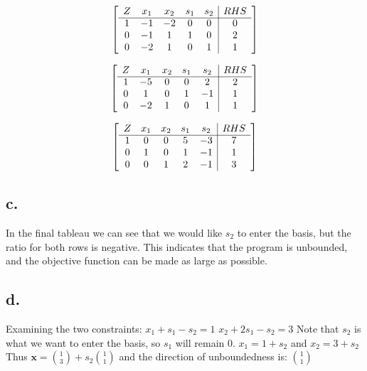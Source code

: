 \documentclass[10pt, letterpaper]{paper}
\begin{document}
\[
	\left[ {\begin{array}{ccccc|c}
	Z & x_1 & x_2 & s_1 & s_2 & RHS\\ \cline{1-6}
	1 & -1 & -2 & 0 & 0 & 0 \\
	0 & -1 & 1 & 1 & 0 & 2 \\
	0 & -2 & 1 & 0 & 1 & 1 \\
	\end{array} } \right]
\]

\[
	\left[ {\begin{array}{ccccc|c}
	Z & x_1 & x_2 & s_1 & s_2 & RHS\\ \cline{1-6}
	1 & -5 & 0 & 0 & 2 & 2 \\
	0 & 1 & 0 & 1 & -1 & 1 \\
	0 & -2 & 1 & 0 & 1 & 1 \\
	\end{array} } \right]
\]

\[
	\left[ {\begin{array}{ccccc|c}
	Z & x_1 & x_2 & s_1 & s_2 & RHS\\ \cline{1-6}
	1 & 0 & 0 & 5 & -3 & 7 \\
	0 & 1 & 0 & 1 & -1 & 1 \\
	0 & 0 & 1 & 2 & -1 & 3 \\
	\end{array} } \right]
\]

\subsection*{c.}
In the final tableau we can see that we would like $s_2$ to enter the basis, but the ratio for both rows is negative. This indicates that the program is unbounded, and the objective function can be made as large as possible.

\subsection*{d.}

Examining the two constraints:
\newline
$x_1 + s_1 - s_2 = 1$
\newline
$x_2 + 2s_1 - s_2 = 3$
\newline
Note that $s_2$ is what we want to enter the basis, so $s_1$ will remain 0.
\newline
$x_1 = 1 + s_2$ and $x_2 = 3 + s_2$
\newline
Thus  $\textbf{x} = {1 \choose 3} + s_2 {1 \choose 1}$ and the direction of unboundedness is: ${1 \choose 1}$
\end{document}
